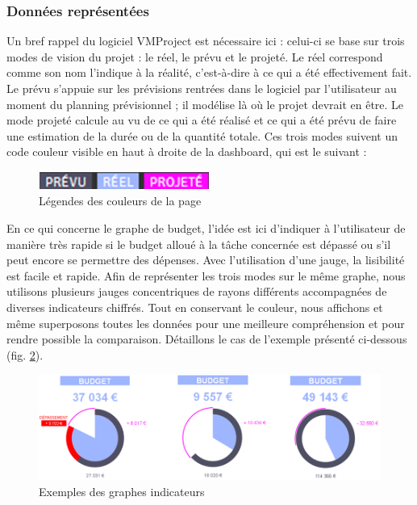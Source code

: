 \documentclass[12pt]{report}
\begin{document}
	\subsubsection{Données représentées}

Un bref rappel du logiciel VMProject est nécessaire ici : celui-ci se base sur trois modes de vision du projet : le réel, le prévu et le projeté. Le réel correspond comme son nom l’indique à la réalité, c’est-à-dire à ce qui a été effectivement fait. Le prévu s’appuie sur les prévisions rentrées dans le logiciel par l’utilisateur au moment du planning prévisionnel ; il modélise là où le projet devrait en être. Le mode projeté calcule au vu de ce qui a été réalisé et ce qui a été prévu de faire une estimation de la durée ou de la quantité totale. Ces trois modes suivent un code couleur visible en haut à droite de la dashboard, qui est le suivant :\\

	\begin{figure}[H]
	\centering
	\includegraphics[width=0.5\textwidth]{pictures/clement/c4.png}
	\caption{Légendes des couleurs de la page}
	\label{c4}
\end{figure}

En ce qui concerne le graphe de budget, l’idée est ici d’indiquer à l’utilisateur de manière très rapide si le budget alloué à la tâche concernée est dépassé ou s’il peut encore se permettre des dépenses. Avec l’utilisation d’une jauge, la lisibilité est facile et rapide. Afin de représenter les trois modes sur le même graphe, nous utilisons plusieurs jauges concentriques de rayons différents accompagnées de diverses indicateurs chiffrés. Tout en conservant le couleur, nous affichons et même superposons toutes les données pour une meilleure compréhension et pour rendre possible la comparaison. Détaillons le cas de l’exemple présenté ci-dessous (fig. \ref{c5}).\\

\begin{figure}[H]
	\centering
	\includegraphics[width=1\textwidth]{pictures/clement/c5.png}
	\caption{Exemples des graphes indicateurs}
	\label{c5}
\end{figure}
\end{document}

